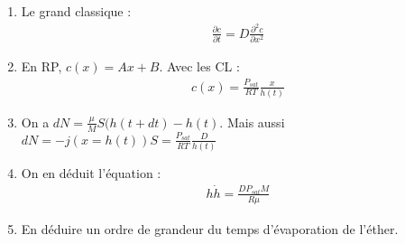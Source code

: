 \begin{correction}

\begin{enumerate}

	\item Le grand classique :
	\begin{align*}
		\frac{\partial c}{\partial t}= D\frac{\partial^2 c}{\partial x^2} 
	\end{align*}
	
	\item En RP, $c(x)=Ax+B$. Avec les CL :
	\begin{align*}
		c(x)=\frac{P_{sat}}{RT}\frac{x}{h(t)}
	\end{align*}
	
	\item On a $dN=\frac{\mu}{M}S(h(t+dt)-h(t)$. Mais aussi $dN=-j(x=h(t))S=\frac{P_{sat}}{RT}\frac{D}{h(t)}$
	
	\item On en déduit l'équation :
	\begin{align*}
		h\dot{h}=\frac{DP_{sat}M}{R\mu}		
	\end{align*}
	
	\item En déduire un ordre de grandeur du temps d'évaporation de l'éther.

\end{enumerate}

\end{correction}